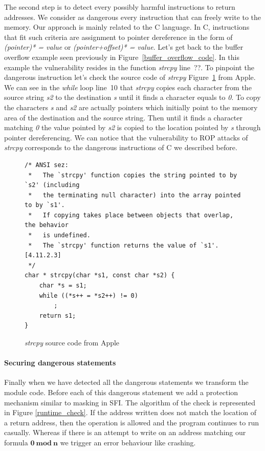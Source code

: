 \documentclass[11pt]{sdm}
\begin{document}
The second step is to detect every possibly harmful instructions to return addresses. We consider as dangerous every instruction that can freely write to the memory. Our approach is mainly related to the C language.
In C, instructions that fit such criteria are assignment to pointer dereference in the form of  \textit{(pointer)* = value} or \textit{(pointer+offset)* = value}. Let's get back to the buffer overflow example seen previously in Figure~\ref{buffer_overflow_code}. 
In this example the vulnerability resides in the function \textit{strcpy} line~??. To pinpoint the dangerous instruction let's check the source code of \textit{strcpy} Figure~\ref{strcpy} from Apple.
We can see in the \textit{while} loop line~10 that \textit{strcpy} copies each character from the source string \textit{s2} to the destination \textit{s} until it finds a character equals to \textit{0}.
To copy the characters \textit{s} and \textit{s2} are actually pointers which initially point to the memory area of the destination and the source string. Then until it finds a character matching \textit{0} the value pointed by \textit{s2} is copied to the location pointed by \textit{s} through pointer dereferencing. We can notice that the vulnerability to ROP attacks of \textit{strcpy} corresponds to the dangerous instructions of C we described before.



\begin{figure}
\begin{lstlisting}
/* ANSI sez:
 *   The `strcpy' function copies the string pointed to by `s2' (including
 *   the terminating null character) into the array pointed to by `s1'.
 *   If copying takes place between objects that overlap, the behavior
 *   is undefined.
 *   The `strcpy' function returns the value of `s1'.  [4.11.2.3]
 */
char * strcpy(char *s1, const char *s2) {
	char *s = s1;
	while ((*s++ = *s2++) != 0)
		;
	return s1;
}
\end{lstlisting}
\centering
\caption{\textit{strcpy} source code from Apple}
\label{strcpy}
\end{figure}

\paragraph{Securing dangerous statements}
\label{par:Protection around dangerous statements}

Finally when we have detected all the dangerous statements we transform the module code. Before each of this dangerous statement we add a protection mechanism similar to masking in SFI. The algorithm of the check is represented in Figure \ref{runtime_check}. If the address written does not match the location of a return address, then the operation is allowed and the program continues to run casually.
Whereas if there is an attempt to write on an address matching our formula $\mathbf{0~mod~n}$ we trigger an error behaviour like crashing.
\end{document}
